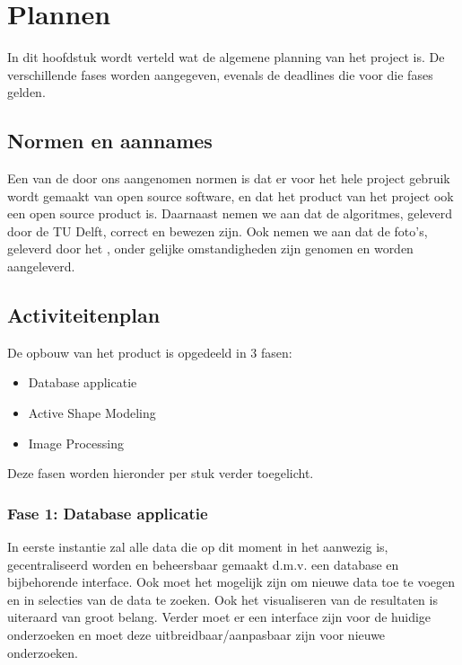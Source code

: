 \section{Plannen}
\label{plannen}

In dit hoofdstuk wordt verteld wat de algemene planning van het project is. 
De verschillende fases worden aangegeven, evenals de deadlines die voor die fases gelden.


\subsection{Normen en aannames}
Een van de door ons aangenomen normen is dat er voor het hele project gebruik wordt gemaakt van open source software, en dat het product van het project ook een open source product is. 
Daarnaast nemen we aan dat de algoritmes, geleverd door de TU Delft, correct en bewezen zijn.
Ook nemen we aan dat de foto's, geleverd door het \casamproject, onder gelijke omstandigheden zijn genomen en worden aangeleverd.

\subsection{Activiteitenplan}
De opbouw van het product is opgedeeld in 3 fasen:
\begin{itemize}
	\item Database applicatie
	\item Active Shape Modeling
	\item Image Processing
\end{itemize}
Deze fasen worden hieronder per stuk verder toegelicht.

\subsubsection{Fase 1: Database applicatie}
In eerste instantie zal alle data die op dit moment in het \casamproject aanwezig is, gecentraliseerd worden en beheersbaar gemaakt d.m.v. een database en bijbehorende interface. 
Ook moet het mogelijk zijn om nieuwe data toe te voegen en in selecties van de data te zoeken. 
Ook het visualiseren van de resultaten is uiteraard van groot belang. 
Verder moet er een interface zijn voor de huidige onderzoeken en moet deze uitbreidbaar/aanpasbaar zijn voor nieuwe onderzoeken.

